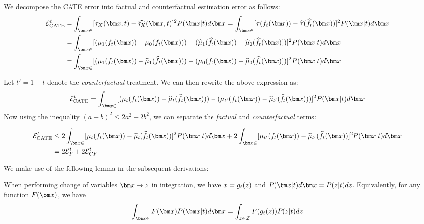 {
We decompose the CATE error into factual and counterfactual estimation error as follows:
\begin{align*}
    \ErrITE^t &= \int_{\xb \in \xspace} [\ITEx(\xb, t) - \ITExhat(\xb, t)]^2 P(\xb|t)d\xb = \int_{\xb \in \xspace} [\tau(\RInv_t(\xb)) - \tauhat(\RInvhat_t(\xb))]^2 P(\xb|t)d\xb\\
    &= \int_{\xb \in \xspace} [(\realmu_1(\RInv_t(\xb)) - \realmu_0(\RInv_t(\xb))) - (\realmuhat_1(\RInvhat_t(\xb)) - \realmuhat_0(\RInvhat_t(\xb)))]^2 P(\xb|t)d\xb\\
    &= \int_{\xb \in \xspace} [(\realmu_1(\RInv_t(\xb)) - \realmuhat_1(\RInvhat_t(\xb))) - (\realmu_0(\RInv_t(\xb)) - \realmuhat_0(\RInvhat_t(\xb)))]^2 P(\xb|t)d\xb\\
\end{align*}

Let $t' = 1 - t$ denote the \textit{counterfactual} treatment. We can then rewrite the above expression as:
\begin{align*}
    \ErrITE^t &= \int_{\xb \in \xspace} [(\realmu_t(\RInv_t(\xb)) - \realmuhat_t(\RInvhat_t(\xb))) - (\realmu_{t'}(\RInv_t(\xb)) - \realmuhat_{t'}(\RInvhat_t(\xb)))]^2 P(\xb|t)d\xb\\
\end{align*}
Now using the inequality $(a - b)^2 \leq 2a^2 + 2b^2$, we can separate the \textit{factual} and \textit{counterfactual} terms:

\begin{align*}
    \ErrITE^t &\leq 2\int_{\xb \in \xspace} [\realmu_t(\RInv_t(\xb)) - \realmuhat_t(\RInvhat_t(\xb))]^2P(\xb|t)d\xb 
    + 2\int_{\xb \in \xspace}[\realmu_{t'}(\RInv_t(\xb)) - \realmuhat_{t'}(\RInvhat_t(\xb))]^2 P(\xb|t)d\xb\\
    &= 2\ErrF^t + 2\ErrCF^t
\end{align*}
}

\iffalse

We make use of the following lemma in the subsequent derivations:
\newcommand{\lemmachangevars}{When performing change of variables $\xb \to z$ in integration, we have $x = \R_t(z)$ and $P(\xb|t)d\xb = P(z|t)dz$. Equivalently, for any function $F(\xb)$, we have 
    \begin{align*}
        \int_{\xb \in \xspace}F(\xb)P(\xb|t)d\xb = \int_{z \in \Zspace} F(\R_t(z))P(z|t)dz
    \end{align*}}
\begin{lemma}
\label{lemma:changevars}
       \lemmachangevars
\end{lemma}

